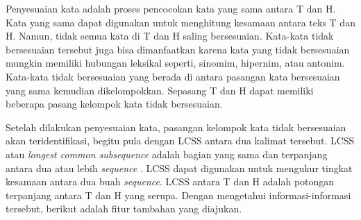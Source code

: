 	Penyesuaian kata adalah proses pencocokan kata yang sama antara T dan H. Kata yang sama dapat digunakan untuk menghitung kesamaan antara teks T dan H. Namun, tidak semua kata di T dan H saling bersesuaian. Kata-kata tidak bersesuaian tersebut juga bisa dimanfaatkan karena kata yang tidak bersesuaian mungkin memiliki hubungan leksikal seperti, sinomim, hipernim, atau antonim. Kata-kata tidak bersesuaian yang berada di antara pasangan kata bersesuaian yang sama kemudian dikelompokkan. Sepasang T dan H dapat memiliki beberapa pasang kelompok kata tidak bersesuaian. 
	
	Setelah dilakukan penyesuaian kata, pasangan kelompok kata tidak bersesuaian akan teridentifikasi, begitu pula dengan LCSS antara dua kalimat tersebut. LCSS atau \textit{longest common subsequence} adalah bagian yang sama dan terpanjang antara dua atau lebih \textit{sequence} \citep{Paterson:1994:LCS:645723.666723}. LCSS dapat digunakan untuk mengukur tingkat kesamaan antara dua buah \textit{sequence}. LCSS antara T dan H adalah potongan terpanjang antara T dan H yang serupa. Dengan mengetahui informasi-informasi tersebut, berikut adalah fitur tambahan yang diajukan.	
